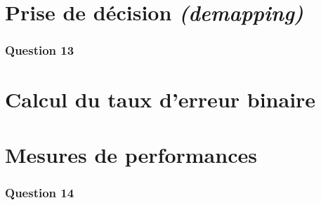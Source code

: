 \documentclass[a4paper,11pt]{article}
\begin{document}
\section{Prise de décision \emph{(demapping)}}
\subsubsection*{Question 13}

\section{Calcul du taux d'erreur binaire}

\section{Mesures de performances}
\subsubsection*{Question 14}

\end{document}

